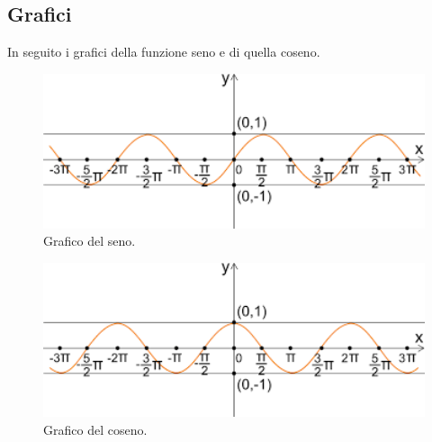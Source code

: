 \documentclass[12pt]{article}
\begin{document}
\subsection{Grafici}
In seguito i grafici della funzione seno e di quella coseno.
\begin{figure}[!htb]
    \centering
    \includegraphics[width=1\textwidth, height=.7\textheight,keepaspectratio]{lezione_6/grafico_seno.png}
    \begin{center}
        \caption{\label{fig:grafico_seno}Grafico del seno.}
    \end{center}
\end{figure}
\begin{figure}[!htb]
    \centering
    \includegraphics[width=1\textwidth, height=.7\textheight,keepaspectratio]{lezione_6/grafico_coseno.png}
    \begin{center}
        \caption{\label{fig:grafico_coseno}Grafico del coseno.}
    \end{center}
\end{figure}
\pagebreak
\end{document}

